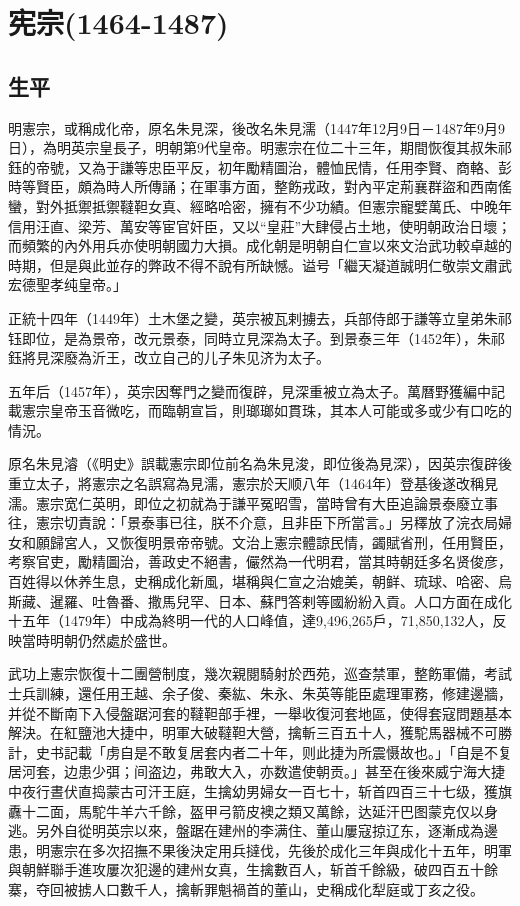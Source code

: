 
\section{宪宗\tiny(1464-1487)}

\subsection{生平}

明憲宗，或稱成化帝，原名朱見深，後改名朱見濡（1447年12月9日－1487年9月9日），為明英宗皇長子，明朝第9代皇帝。明憲宗在位二十三年，期間恢復其叔朱祁鈺的帝號，又為于謙等忠臣平反，初年勵精圖治，體恤民情，任用李賢、商輅、彭時等賢臣，頗為時人所傳誦；在軍事方面，整飭戎政，對內平定荊襄群盜和西南傜蠻，對外抵禦抵禦韃靼女真、經略哈密，擁有不少功績。但憲宗寵嬖萬氏、中晚年信用汪直、梁芳、萬安等宦官奸臣，又以“皇莊”大肆侵占土地，使明朝政治日壞；而頻繁的內外用兵亦使明朝國力大損。成化朝是明朝自仁宣以來文治武功較卓越的時期，但是與此並存的弊政不得不說有所缺憾。谥号「繼天凝道誠明仁敬崇文肅武宏德聖孝纯皇帝。」

正統十四年（1449年）土木堡之變，英宗被瓦剌擄去，兵部侍郎于謙等立皇弟朱祁钰即位，是為景帝，改元景泰，同時立見深為太子。到景泰三年（1452年），朱祁鈺將見深廢為沂王，改立自己的儿子朱见济为太子。

五年后（1457年），英宗因奪門之變而復辟，見深重被立為太子。萬曆野獲編中記載憲宗皇帝玉音微吃，而臨朝宣旨，則瑯瑯如貫珠，其本人可能或多或少有口吃的情況。

原名朱見濬（《明史》誤載憲宗即位前名為朱見浚，即位後為見深），因英宗復辟後重立太子，將憲宗之名誤寫為見濡，憲宗於天顺八年（1464年）登基後遂改稱見濡。憲宗宽仁英明，即位之初就為于謙平冤昭雪，當時曾有大臣追論景泰廢立事往，憲宗切責說：「景泰事已往，朕不介意，且非臣下所當言。」另䆁放了浣衣局婦女和願歸宮人，又恢復明景帝帝號。文治上憲宗體諒民情，蠲賦省刑，任用賢臣，考察官吏，勵精圖治，善政史不絕書，儼然為一代明君，當其時朝廷多名贤俊彦，百姓得以休养生息，史稱成化新風，堪稱與仁宣之治媲美，朝鲜、琉球、哈密、烏斯藏、暹羅、吐魯番、撒馬兒罕、日本、蘇門答剌等國紛紛入貢。人口方面在成化十五年（1479年）中成為終明一代的人口峰值，達9,496,265戶，71,850,132人，反映當時明朝仍然處於盛世。

武功上憲宗恢復十二團營制度，幾次親閱騎射於西苑，巡查禁軍，整飭軍備，考試士兵訓練，還任用王越、余子俊、秦紘、朱永、朱英等能臣處理軍務，修建邊牆，并從不斷南下入侵盤踞河套的韃靼部手裡，一舉收復河套地區，使得套寇問題基本解決。在紅鹽池大捷中，明軍大破韃靼大營，擒斬三百五十人，獲駝馬器械不可勝計，史书記載「虏自是不敢复居套内者二十年，则此捷为所震慑故也。」「自是不复居河套，边患少弭；间盗边，弗敢大入，亦数遣使朝贡。」甚至在後來威宁海大捷中夜行晝伏直捣蒙古可汗王庭，生擒幼男婦女一百七十，斩首四百三十七级，獲旗纛十二面，馬駝牛羊六千餘，盔甲弓箭皮襖之類又萬餘，达延汗巴图蒙克仅以身逃。另外自從明英宗以來，盤踞在建州的李满住、董山屢寇掠辽东，逐漸成為邊患，明憲宗在多次招撫不果後決定用兵撻伐，先後於成化三年與成化十五年，明軍與朝鮮聯手進攻屢次犯邊的建州女真，生擒數百人，斩首千餘級，破四百五十餘寨，夺回被掳人口數千人，擒斬罪魁禍首的董山，史稱成化犁庭或丁亥之役。

